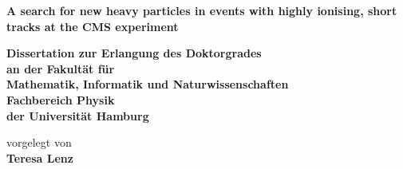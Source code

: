 \begin{titlepage}
   \begin{center}
     \thispagestyle{empty}
     \vspace*{0.1cm}
     \linespread{1.5}
       {\huge\bfseries A search for new heavy particles in events with highly ionising, short tracks at the CMS experiment\par}
       \begin{Large} 
         \textbf{Dissertation zur Erlangung des Doktorgrades\\
                 an der Fakult\"{a}t f\"{u}r\\
                 Mathematik, Informatik und Naturwissenschaften\\
                 Fachbereich Physik\\
                 der Universit\"{a}t Hamburg\\}
       \end{Large}
       \vskip2cm
       \begin{large}
         vorgelegt von\\
         {\bf Teresa Lenz}
         \vfill
       \end{large}
   \end{center}
 \end{titlepage}
 
 
 \cleardoublepage 

